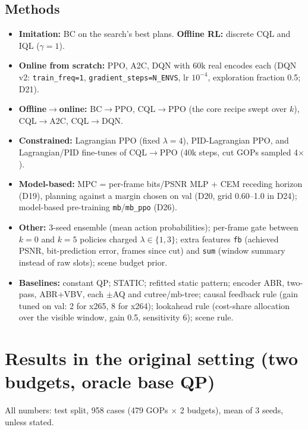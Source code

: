 \documentclass[10pt,a4paper]{article}
\newcommand{\code}[1]{\texttt{\small #1}}
\begin{document}
\subsection{Methods}
\begin{itemize}
\item \textbf{Imitation:} BC on the search's best plans. \textbf{Offline RL:} discrete CQL and IQL ($\gamma=1$).
\item \textbf{Online from scratch:} PPO, A2C, DQN with 60k real encodes each (DQN v2: \code{train\_freq=1},
\code{gradient\_steps=N\_ENVS}, lr $10^{-4}$, exploration fraction 0.5; D21).
\item \textbf{Offline$\to$online:} BC$\to$PPO, CQL$\to$PPO (the core recipe swept over $k$), CQL$\to$A2C, CQL$\to$DQN.
\item \textbf{Constrained:} Lagrangian PPO (fixed $\lambda=4$), PID-Lagrangian PPO, and Lagrangian/PID fine-tunes of
CQL$\to$PPO (40k steps, cut GOPs sampled 4$\times$).
\item \textbf{Model-based:} MPC = per-frame bits/PSNR MLP + CEM receding horizon (D19), planning against a margin
chosen on val (D20, grid 0.60--1.0 in D24); model-based pre-training \code{mb}/\code{mb\_ppo} (D26).
\item \textbf{Other:} 3-seed ensemble (mean action probabilities); per-frame gate between $k=0$ and $k=5$ policies charged
$\lambda\in\{1,3\}$; extra features \code{fb} (achieved PSNR, bit-prediction error, frames since cut) and \code{sum}
(window summary instead of raw slots); scene budget prior.
\item \textbf{Baselines:} constant QP; STATIC; refitted static pattern; encoder ABR, two-pass, ABR+VBV, each $\pm$AQ
and cutree/mb-tree; causal feedback rule (gain tuned on val: 2 for x265, 8 for x264); lookahead rule (cost-share
allocation over the visible window, gain 0.5, sensitivity 6); scene rule.
\end{itemize}

\section{Results in the original setting (two budgets, oracle base QP)}
All numbers: test split, 958 cases (479 GOPs $\times$ 2 budgets), mean of 3 seeds, unless stated.
\end{document}
